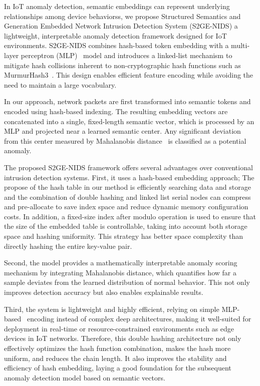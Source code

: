 \begin{ZhChapter}
    In IoT anomaly detection, semantic embeddings can represent underlying relationships among device behaviorss, we propose Structured Semantics and Generation Embedded Network Intrusion Detection System (S2GE-NIDS) a lightweight, interpretable anomaly detection framework designed for IoT environments. S2GE-NIDS combines hash-based token embedding with a multi-layer perceptron (MLP)~\cite{taud2017multilayer} model and introduces a linked-list mechanism to mitigate hash collisions inherent to non-cryptographic hash functions such as MurmurHash3~\cite{senuma2025mmh3}. This design enables efficient feature encoding while avoiding the need to maintain a large vocabulary.

    In our approach, network packets are first transformed into semantic tokens and encoded using hash-based indexing. The resulting embedding vectors are concatenated into a single, fixed-length semantic vector, which is processed by an MLP and projected near a learned semantic center. Any significant deviation from this center measured by Mahalanobis distance~\cite{de2000mahalanobis} is classified as a potential anomaly.

    The proposed S2GE-NIDS framework offers several advantages over conventional intrusion detection systems. First, it uses a hash-based embedding approach; The propose of the hash table in our method is efficiently searching data and storage and the combination of double hashing and linked list serial nodes can compress and pre-allocate to save index space and reduce dynamic memory configuration costs. In addition, a fixed-size index after modulo operation is used to ensure that the size of the embedded table is controllable, taking into account both storage space and hashing uniformity. This strategy has better space complexity than directly hashing the entire key-value pair.

    Second, the model provides a mathematically interpretable anomaly scoring mechanism by integrating Mahalanobis distance, which quantifies how far a sample deviates from the learned distribution of normal behavior. This not only improves detection accuracy but also enables explainable results.

    Third, the system is lightweight and highly efficient, relying on simple MLP-based~\cite{9595282} encoding instead of complex deep architectures, making it well-suited for deployment in real-time or resource-constrained environments such as edge devices in IoT networks. Therefore, this double hashing architecture not only effectively optimizes the hash function combination, makes the hash more uniform, and reduces the chain length. It also improves the stability and efficiency of hash embedding, laying a good foundation for the subsequent anomaly detection model based on semantic vectors.



\end{ZhChapter}
